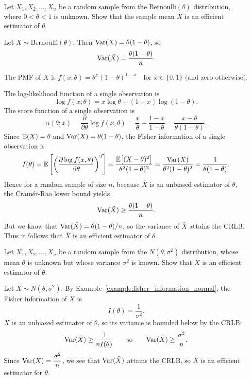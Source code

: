 \begin{example}
Let $X_1,X_2,\ldots,X_n$ be a random sample from the $\text{Bernoulli}(\theta)$ distribution, where $0<\theta<1$ is unknown. Show that the sample mean $\bar{X}$ is an efficient estimator of $\theta$.
\end{example}

\begin{solution}
Let $X\sim\text{Bernoulli}(\theta)$. Then $\text{Var}(X)=\theta(1-\theta)$, so 
\[
\text{Var}(\bar{X})=\frac{\theta(1-\theta)}{n}.
\]
\par
\par
The PMF of $X$ is 
$
f(x;\theta)=\theta^x(1-\theta)^{1-x}\quad\text{for $x\in\{0,1\}$ (and zero otherwise).}
$
\par
The log-likelihood function of a single observation is
\[
\log f(x;\theta) = x\log\theta + (1-x)\log(1-\theta).
\]
The score function of a single observation is
\[
u(\theta;x)
	= \frac{\partial}{\partial\theta}\log f(x,\theta)
	= \frac{x}{\theta} - \frac{1-x}{1-\theta}
	= \frac{x-\theta}{\theta(1-\theta)}.
\]
Since $\mathbb{E}(X)=\theta$ and $\text{Var}(X)=\theta(1-\theta)$, the Fisher information of a single observation is
\[
I(\theta) = \mathbb{E}\left[\left(\frac{\partial\log f(x,\theta)}{\partial\theta}\right)^2\right]
	= \frac{\mathbb{E}\big[(X-\theta)^2\big]}{\theta^2(1-\theta)^2} 
	= \frac{\text{Var}(X)}{\theta^2(1-\theta)^2} 
	= \frac{1}{\theta(1-\theta)}.
\]
Hence for a random sample of size $n$, because $\bar{X}$ is an unbiased estimator of $\theta$, the Cram\'{e}r-Rao lower bound yields
\[
\text{Var}(\bar{X}) \geq \frac{\theta(1-\theta)}{n}.
\]
But we know that $\text{Var}(\bar{X})=\theta(1-\theta)/n$, so the variance of $\bar{X}$ attains the CRLB. Thus it follows that $\bar{X}$ is an efficient estimator of $\theta$.
\end{solution}

\begin{example}
Let $X_1,X_2,\ldots,X_n$ be a random sample from the $N(\theta,\sigma^2)$ distribution, whose mean $\theta$ is unknown but whose variance $\sigma^2$ is known. Show that $\bar{X}$ is an efficient estimator of $\theta$.
\end{example}
\begin{solution}
Let $X\sim N(\theta,\sigma^2)$. By Example~\ref{example:fisher_information_normal}, the Fisher information of $X$ is 
\[
I(\theta) = \displaystyle\frac{1}{\sigma^2}.
\]
$\bar{X}$ is an unbiased estimator of $\theta$, so its variance is bounded below by the CRLB:
\[
\text{Var}(\bar{X}) \geq \frac{1}{nI(\theta)} 
\qquad\text{so}\qquad
\text{Var}(\bar{X}) \geq \frac{\sigma^2}{n}.
\]
Since $\text{Var}(\bar{X}) = \displaystyle\frac{\sigma^2}{n}$, we see that $\text{Var}(\bar{X})$ attains the CRLB, so $\bar{X}$ is an efficient estimator for $\theta$.
\end{solution}

